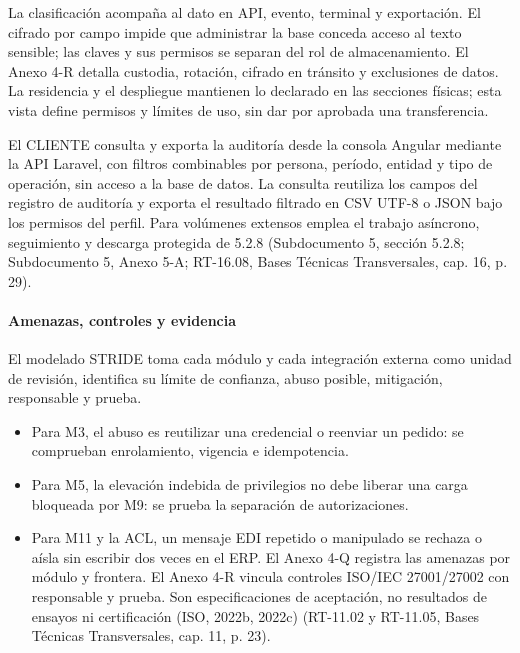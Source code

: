 La clasificación acompaña al dato en API, evento, terminal y exportación. El cifrado por campo impide que administrar la base conceda acceso al texto sensible; las claves y sus permisos se separan del rol de almacenamiento. El Anexo 4-R detalla custodia, rotación, cifrado en tránsito y exclusiones de datos. La residencia y el despliegue mantienen lo declarado en las secciones físicas; esta vista define permisos y límites de uso, sin dar por aprobada una transferencia.

El CLIENTE consulta y exporta la auditoría desde la consola Angular mediante la API Laravel, con filtros combinables por persona, período, entidad y tipo de operación, sin acceso a la base de datos. La consulta reutiliza los campos del registro de auditoría y exporta el resultado filtrado en CSV UTF-8 o JSON bajo los permisos del perfil. Para volúmenes extensos emplea el trabajo asíncrono, seguimiento y descarga protegida de 5.2.8 (Subdocumento 5, sección 5.2.8; Subdocumento 5, Anexo 5-A; RT-16.08, Bases Técnicas Transversales, cap. 16, p. 29).

\paragraph{Amenazas, controles y evidencia}
El modelado STRIDE toma cada módulo y cada integración externa como unidad de revisión, identifica su límite de confianza, abuso posible, mitigación, responsable y prueba.

\begin{itemize}
  \item Para M3, el abuso es reutilizar una credencial o reenviar un pedido: se comprueban enrolamiento, vigencia e idempotencia.
  \item Para M5, la elevación indebida de privilegios no debe liberar una carga bloqueada por M9: se prueba la separación de autorizaciones.
  \item Para M11 y la ACL, un mensaje EDI repetido o manipulado se rechaza o aísla sin escribir dos veces en el ERP. El Anexo 4-Q registra las amenazas por módulo y frontera. El Anexo 4-R vincula controles ISO/IEC 27001/27002 con responsable y prueba. Son especificaciones de aceptación, no resultados de ensayos ni certificación (ISO, 2022b, 2022c) (RT-11.02 y RT-11.05, Bases Técnicas Transversales, cap. 11, p. 23).
\end{itemize}

